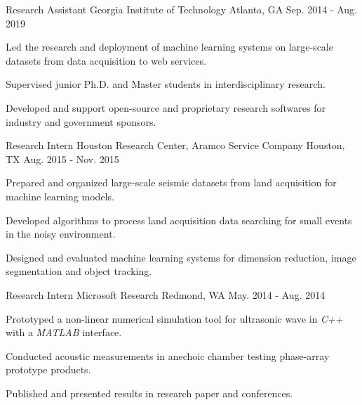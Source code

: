 \begin{cventries}
	\cventry
		{Research Assistant} %
		{Georgia Institute of Technology} %
		{Atlanta, GA} %
		{Sep. 2014 - Aug. 2019} %
		{
			\begin{cvitems} %
				\item {Led the research and deployment of machine learning systems on large-scale %
				datasets from data acquisition to web services.}
				\item {Supervised junior Ph.D. and Master students in interdisciplinary research.}
				\item {Developed and support open-source and proprietary research softwares for %
				industry and government sponsors.}
			\end{cvitems}
		}

	\cventry
		{Research Intern} %
		{Houston Research Center, Aramco Service Company} %
		{Houston, TX} %
		{Aug. 2015 - Nov. 2015} %
		{
			\begin{cvitems} %
				\item {Prepared and organized large-scale seismic datasets from land acquisition %
				for machine learning models.}
				\item {Developed algorithms to process land acquisition data searching for small %
				events in the noisy environment.}
				\item {Designed and evaluated machine learning systems for dimension reduction, %
				image segmentation and object tracking.}
			\end{cvitems}
		}

	\cventry
		{Research Intern} %
		{Microsoft Research} %
		{Redmond, WA} %
		{May. 2014 - Aug. 2014} %
		{
			\begin{cvitems} %
				\item {Prototyped a non-linear numerical simulation tool for ultrasonic wave in %
				\textit{C++} with a \textit{MATLAB} interface.}
				\item {Conducted acoustic measurements in anechoic chamber testing phase-array %
				prototype products.}
				\item {Published and presented results in research paper and conferences.}
			\end{cvitems}
		}


\end{cventries}
